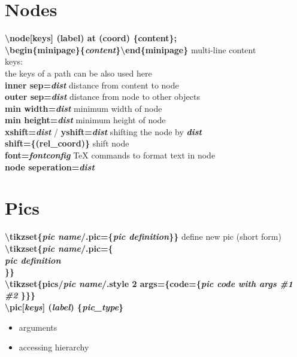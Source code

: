 \documentclass[10pt]{article}
\newcommand{\tikzcmd}[1]{\textbf{#1}}
\newcommand{\tikzparam}[1]{\textbf{\emph{#1}}}
\begin{document}
\begin{multicols}{2}
        \section{Nodes}
        \tikzcmd{\textbackslash node[keys] (label) at (coord) \{content\};}\\
        \tikzcmd{\textbackslash begin\{minipage\}\{\tikzparam{content}\}\textbackslash end\{minipage\} } multi-line content\\
        keys:\\
        the keys of a path can be also used here\\
        \tikzcmd{inner sep=\tikzparam{dist}} distance from content to node\\
        \tikzcmd{outer sep=\tikzparam{dist}} distance from node to other objects\\
        \tikzcmd{min width=\tikzparam{dist}} minimum width of node\\
        \tikzcmd{min height=\tikzparam{dist}} minimum height of node\\
        \tikzcmd{xshift=\tikzparam{dist}} / \tikzcmd{yshift=\tikzparam{dist}} shifting the node by \tikzparam{dist}\\
        \tikzcmd{shift=\{(rel\_coord)\}} shift node\\
        \tikzcmd{font=\tikzparam{fontconfig}} TeX commands to format text in node\\
        \tikzcmd{node seperation=\tikzparam{dist}}

        \section{Pics}

        \tikzcmd{\textbackslash tikzset\{\tikzparam{pic name}/.pic=\{\tikzparam{pic definition}\}\}} define new pic (short form)\\
        \tikzcmd{\textbackslash tikzset\{\tikzparam{pic name}/.pic=\{\\
           \tikzparam{pic definition}\\
        \}\}}\\
        \tikzcmd{\textbackslash tikzset\{pics/\tikzparam{pic name}/.style 2 args=\{code=\{\tikzparam{pic code with args \#1 \#2} \}\}\}}\\

        \tikzcmd{\textbackslash pic[\tikzparam{keys}] (\tikzparam{label}) \{\tikzparam{pic\_type}\} }\\

        \begin{itemize}
            \item arguments
            \item accessing hierarchy
        \end{itemize}


\end{multicols}
\end{document}
